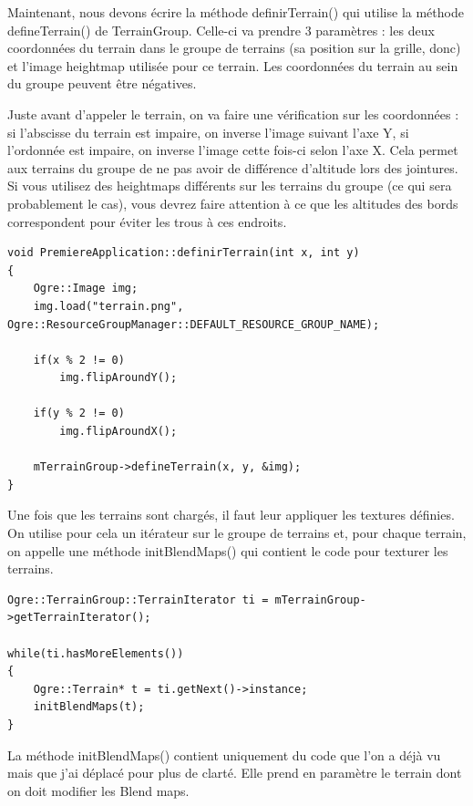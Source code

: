 Maintenant, nous devons \'ecrire la m\'ethode definirTerrain() qui utilise la m\'ethode defineTerrain() de TerrainGroup. Celle-ci va prendre 3 param\`etres : les deux coordonn\'ees du terrain dans le groupe de terrains (sa position sur la grille, donc) et l'image heightmap utilis\'ee pour ce terrain. Les coordonn\'ees du terrain au sein du groupe peuvent \^etre n\'egatives.

Juste avant d'appeler le terrain, on va faire une v\'erification sur les coordonn\'ees : si l'abscisse du terrain est impaire, on inverse l'image suivant l'axe Y, si l'ordonn\'ee est impaire, on inverse l'image cette fois-ci selon l'axe X. Cela permet aux terrains du groupe de ne pas avoir de diff\'erence d'altitude lors des jointures. Si vous utilisez des heightmaps diff\'erents sur les terrains du groupe (ce qui sera probablement le cas), vous devrez faire attention \`a ce que les altitudes des bords correspondent pour \'eviter les trous \`a ces endroits.

\begin{lstlisting}[caption={PremiereApplication.definirTerrain}]
void PremiereApplication::definirTerrain(int x, int y)
{
    Ogre::Image img;
    img.load("terrain.png", Ogre::ResourceGroupManager::DEFAULT_RESOURCE_GROUP_NAME);

    if(x % 2 != 0)
        img.flipAroundY();

    if(y % 2 != 0)
        img.flipAroundX();

    mTerrainGroup->defineTerrain(x, y, &img);
}
\end{lstlisting}

Une fois que les terrains sont charg\'es, il faut leur appliquer les textures d\'efinies. On utilise pour cela un it\'erateur sur le groupe de terrains et, pour chaque terrain, on appelle une m\'ethode initBlendMaps() qui contient le code pour texturer les terrains.

\begin{lstlisting}[caption={}]
Ogre::TerrainGroup::TerrainIterator ti = mTerrainGroup->getTerrainIterator();

while(ti.hasMoreElements())
{
    Ogre::Terrain* t = ti.getNext()->instance;
    initBlendMaps(t);
}
\end{lstlisting}

La m\'ethode initBlendMaps() contient uniquement du code que l'on a d\'ej\`a vu mais que j'ai d\'eplac\'e pour plus de clart\'e. Elle prend en param\`etre le terrain dont on doit modifier les Blend maps.

